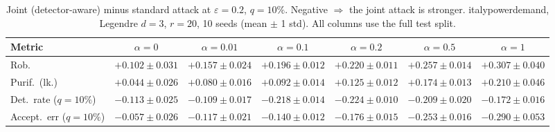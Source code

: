 \begin{table}[htbp]
  \centering
  \small
  \begin{tabular}{@{}lcccccc@{}}
    \toprule
    Metric & $\alpha{=}0$ & $\alpha{=}0.01$ & $\alpha{=}0.1$ & $\alpha{=}0.2$ & $\alpha{=}0.5$ & $\alpha{=}1$ \\
    \midrule
    Rob. & $+0.102 \pm 0.031$ & $+0.157 \pm 0.024$ & $+0.196 \pm 0.012$ & $+0.220 \pm 0.011$ & $+0.257 \pm 0.014$ & $+0.307 \pm 0.040$ \\
    Purif.\ (lk.) & $+0.044 \pm 0.026$ & $+0.080 \pm 0.016$ & $+0.092 \pm 0.014$ & $+0.125 \pm 0.012$ & $+0.174 \pm 0.013$ & $+0.210 \pm 0.046$ \\
    Det.\ rate ($q{=}10\%$) & $-0.113 \pm 0.025$ & $-0.109 \pm 0.017$ & $-0.218 \pm 0.014$ & $-0.224 \pm 0.010$ & $-0.209 \pm 0.020$ & $-0.172 \pm 0.016$ \\
    Accept.\ err ($q{=}10\%$) & $-0.057 \pm 0.026$ & $-0.117 \pm 0.021$ & $-0.140 \pm 0.012$ & $-0.176 \pm 0.015$ & $-0.253 \pm 0.016$ & $-0.290 \pm 0.053$ \\
    \bottomrule
  \end{tabular}
  \caption{Joint (detector-aware) minus standard attack at $\varepsilon=0.2$, $q{=}10\%$. Negative $\Rightarrow$ the joint attack is stronger. italypowerdemand, Legendre $d{=}3$, $r{=}20$, 10 seeds (mean $\pm$ 1 std). All columns use the full test split.}
  \label{tab:italypowerdemand_joint_r20_eps0.2}
\end{table}

